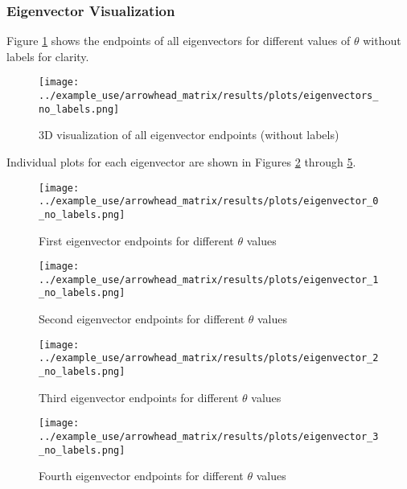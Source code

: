 \subsubsection{Eigenvector Visualization}

Figure \ref{fig:eigenvectors_no_labels_gen} shows the endpoints of all eigenvectors for different values of $\theta$ without labels for clarity.

\begin{figure}[H]
    \centering
    \texttt{[image: ../example\_use/arrowhead\_matrix/results/plots/eigenvectors\_no\_labels.png]}
    \caption{3D visualization of all eigenvector endpoints (without labels)}
    \label{fig:eigenvectors_no_labels_gen}
\end{figure}

Individual plots for each eigenvector are shown in Figures \ref{fig:eigenvector_0_no_labels_gen} through \ref{fig:eigenvector_3_no_labels_gen}.

\begin{figure}[H]
    \centering
    \texttt{[image: ../example\_use/arrowhead\_matrix/results/plots/eigenvector\_0\_no\_labels.png]}
    \caption{First eigenvector endpoints for different $\theta$ values}
    \label{fig:eigenvector_0_no_labels_gen}
\end{figure}

\begin{figure}[H]
    \centering
    \texttt{[image: ../example\_use/arrowhead\_matrix/results/plots/eigenvector\_1\_no\_labels.png]}
    \caption{Second eigenvector endpoints for different $\theta$ values}
    \label{fig:eigenvector_1_no_labels_gen}
\end{figure}

\begin{figure}[H]
    \centering
    \texttt{[image: ../example\_use/arrowhead\_matrix/results/plots/eigenvector\_2\_no\_labels.png]}
    \caption{Third eigenvector endpoints for different $\theta$ values}
    \label{fig:eigenvector_2_no_labels_gen}
\end{figure}

\begin{figure}[H]
    \centering
    \texttt{[image: ../example\_use/arrowhead\_matrix/results/plots/eigenvector\_3\_no\_labels.png]}
    \caption{Fourth eigenvector endpoints for different $\theta$ values}
    \label{fig:eigenvector_3_no_labels_gen}
\end{figure}

